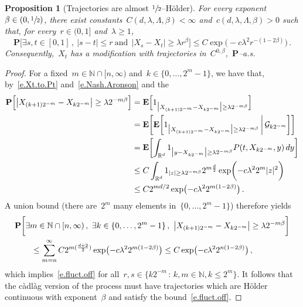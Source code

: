 \documentclass[11pt]{article} %
\numberwithin{equation}{section}
\newtheorem{proposition}[theorem]{Proposition}
\theoremstyle{definition}
\newcommand*{\N}{\ensuremath{\mathbb{N}}}
\newcommand*{\Rd}{\ensuremath{\mathbb{R}^d}}
\newcommand{\indc}{1}
\begin{document}
\begin{proposition}[Trajectories are almost $\sfrac12$--H\"older]
\label{p.Holder.trajectories}
\hspace{0.1pt} For every exponent~$\beta \in (0,\sfrac12)$, there exist constants~$C(d,\lambda,\Lambda,\beta)<\infty$ and~$c(d,\lambda,\Lambda,\beta) > 0$ such that, for every~$r\in (0,1]$ and~$\lambda\geq 1$,
\begin{equation}
\label{e.fluct.off}
\mathbf{P} 
\biggl[
\exists s,t \in [0,1]\,, 
\ |s-t|\leq r 
\ \mbox{and} \  
\ 
\bigl| X_{s} - X_{t} \bigr| 
\geq 
\lambda
r^\beta
\biggr]
\leq 
C \exp \bigl( - c\lambda^2 r^{-(1-2\beta)} \bigr)\,.
\end{equation}
Consequently,~$X_t$ has a modification with trajectories in~$C^{0,\beta}$,~$\mathbf{P}$--a.s.
\end{proposition}
\begin{proof}
For a fixed~$m \in \N \cap [n,\infty)$ and~$k \in \{0,\ldots,2^m-1\}$, we have that, by~\eqref{e.Xt.to.Pt} and~\eqref{e.Nash.Aronson} and the
\begin{align*}
\mathbf{P} 
\Bigl[
\bigl| X_{(k+1)2^{-m}} - X_{k2^{-m}} \bigr| 
\geq \lambda 2^{-m\beta}  
\Bigr]
&
=
\mathbf{E}
\Bigl[
\indc_{
\bigl| X_{(k+1)2^{-m}} - X_{k2^{-m}} \bigr| 
\geq \lambda 2^{-m\beta}  
}
\Bigr]
\\ & 
=
\mathbf{E}
\biggl[
\mathbf{E}
\biggl[
\indc_{
\bigl| X_{(k+1)2^{-m}} - X_{k2^{-m}} \bigr| 
\geq \lambda 2^{-m\beta}  
}
\, \bigg\vert\, 
\mathcal{G}_{k2^{-m}} 
\biggr] 
\biggr]
\\ & 
=
\mathbf{E}
\biggl[
\int_{\Rd} 
\indc_{\bigl| y - X_{k2^{-m}} \bigr| 
\geq \lambda 2^{-m\beta} }
P(t,X_{k2^{-m}},y)\,dy
\biggr]\\ & 
\leq
C
\int_{\Rd} 
\indc_{|z|\geq \lambda 2^{-m\beta}}
2^{m\frac d2} 
\exp\biggl( -c\lambda^2 2^m |z|^2 \biggr)
\\ & 
\leq 
C 2^{md/2} \exp \bigl( - c\lambda^2 2^{m(1-2\beta)} \bigr)
\,.
\end{align*}
A union bound (there are~$2^m$ many elements in~$\{ 0,\ldots,2^m-1\}$) therefore yields
\begin{align*}
&
\mathbf{P} 
\biggl[
\exists m \in \N \cap [n,\infty)\,, \ \exists k \in \{0,\ldots,2^m-1\}\,, 
\  
\bigl| X_{(k+1)2^{-m}} - X_{k2^{-m}} \bigr| 
\geq \lambda2^{-m\beta}  
\biggr]
\notag \\ & \qquad
\leq 
\sum_{m=n}^\infty
C 2^{m( \frac{d+2}{2}) } \exp \bigl( - c\lambda^2 2^{m(1-2\beta)} \bigr)
\leq 
C \exp \bigl( - c \lambda^2 2^{n(1-2\beta)} \bigr)\,,
\end{align*}
which implies~\eqref{e.fluct.off} for all~$r,s \in \{ k2^{-m} \,:\, k,m\in\N, k\leq 2^m\}$.
It follows that the c\`adl\`ag version of the process must have trajectories which are H\"older continuous  with exponent~$\beta$ and satisfy the bound~\eqref{e.fluct.off}.
\end{proof}
\end{document}
